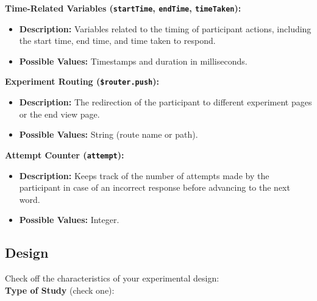 \documentclass{article}
\begin{document}
\begin{tcolorbox}[title=Blocking Variables]

\textbf{Time-Related Variables (\texttt{startTime}, \texttt{endTime}, \texttt{timeTaken}):}
\begin{itemize}
    \item \textbf{Description:} Variables related to the timing of participant actions, including the start time, end time, and time taken to respond.
    \item \textbf{Possible Values:} Timestamps and duration in milliseconds.
\end{itemize}

\textbf{Experiment Routing (\texttt{\$router.push}):}
\begin{itemize}
    \item \textbf{Description:} The redirection of the participant to different experiment pages or the end view page.
    \item \textbf{Possible Values:} String (route name or path).
\end{itemize}

\textbf{Attempt Counter (\texttt{attempt}):}
\begin{itemize}
    \item \textbf{Description:} Keeps track of the number of attempts made by the participant in case of an incorrect response before advancing to the next word.
    \item \textbf{Possible Values:} Integer.
\end{itemize}

\end{tcolorbox}

\subsection{Design}
Check off the characteristics of your experimental design:\\

\textbf{Type of Study} (check one):\\
\noindent
\begin{minipage}{0.4\textwidth}
\end{minipage}%
\begin{minipage}{0.4\textwidth}
\end{minipage}%
\begin{minipage}{0.2\textwidth}
\end{minipage}\\\\
\end{document}
